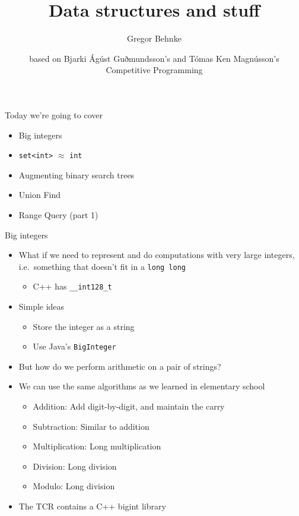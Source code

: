\documentclass[12pt,t]{beamer}
\title{Data structures and stuff}
\author{Gregor Behnke}
\institute{Institute of Artificial Intelligence\\ Ulm University}
\date{\tiny based on Bjarki Ágúst Guðmundsson's and Tómas Ken Magnússon's\\Competitive Programming}
\newcommand{\bi}{\begin{itemize}}
\newcommand{\ei}{\end{itemize}}
\begin{document}
{
    \frame{
        \titlepage
    }
}


\begin{frame}{Today we're going to cover}
    \vspace{30pt}
    \bi
        \item Big integers
		\item \texttt{set<int>} $\approx$ \texttt{int}
        \item Augmenting binary search trees
        \item Union Find
		\item Range Query (part 1)
    \ei
\end{frame}

\begin{frame}{Big integers}
    \bi
        \item What if we need to represent and do computations with very large integers, i.e.\ something that doesn't fit in a \texttt{long long}
        
        \bi
	  \item C++ has \texttt{\_\_int128\_t}
	\ei

        \vspace{5pt}
        \item Simple ideas
	  \bi
	    \item Store the integer as a string
	    \item Use Java's \texttt{BigInteger}
	  \ei
        \vspace{5pt}
        \item But how do we perform arithmetic on a pair of strings?
        \item We can use the same algorithms as we learned in elementary school
            \bi
                \item Addition: Add digit-by-digit, and maintain the carry
                \item Subtraction: Similar to addition
                \item Multiplication: Long multiplication
                \item Division: Long division
                \item Modulo: Long division
            \ei
        \item The TCR contains a C++ bigint library
    \ei
\end{frame}
\end{document}
